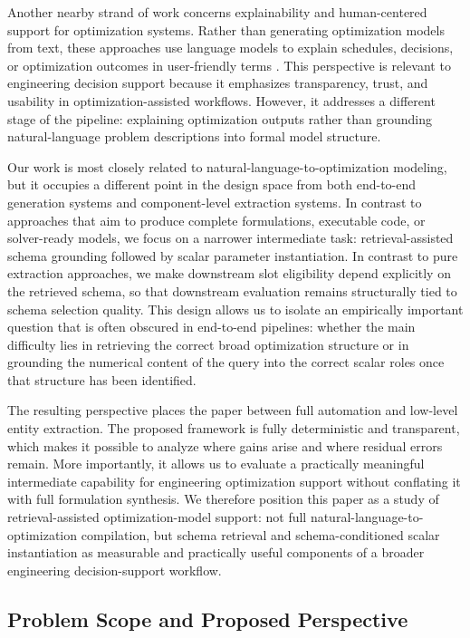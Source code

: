 \documentclass[pdflatex,sn-basic,Numbered]{sn-jnl}
\begin{document}
Another nearby strand of work concerns explainability and human-centered support for optimization systems. Rather than generating optimization models from text, these approaches use language models to explain schedules, decisions, or optimization outcomes in user-friendly terms \cite{biemans2025explainableoptimization,powell2025scheduling_explanations}. This perspective is relevant to engineering decision support because it emphasizes transparency, trust, and usability in optimization-assisted workflows. However, it addresses a different stage of the pipeline: explaining optimization outputs rather than grounding natural-language problem descriptions into formal model structure.

Our work is most closely related to natural-language-to-optimization modeling, but it occupies a different point in the design space from both end-to-end generation systems and component-level extraction systems. In contrast to approaches that aim to produce complete formulations, executable code, or solver-ready models, we focus on a narrower intermediate task: retrieval-assisted schema grounding followed by scalar parameter instantiation. In contrast to pure extraction approaches, we make downstream slot eligibility depend explicitly on the retrieved schema, so that downstream evaluation remains structurally tied to schema selection quality. This design allows us to isolate an empirically important question that is often obscured in end-to-end pipelines: whether the main difficulty lies in retrieving the correct broad optimization structure or in grounding the numerical content of the query into the correct scalar roles once that structure has been identified.

The resulting perspective places the paper between full automation and low-level entity extraction. The proposed framework is fully deterministic and transparent, which makes it possible to analyze where gains arise and where residual errors remain. More importantly, it allows us to evaluate a practically meaningful intermediate capability for engineering optimization support without conflating it with full formulation synthesis. We therefore position this paper as a study of retrieval-assisted optimization-model support: not full natural-language-to-optimization compilation, but schema retrieval and schema-conditioned scalar instantiation as measurable and practically useful components of a broader engineering decision-support workflow.


\subsection{Problem Scope and Proposed Perspective}
\label{subsec:intro_scope}
\end{document}

